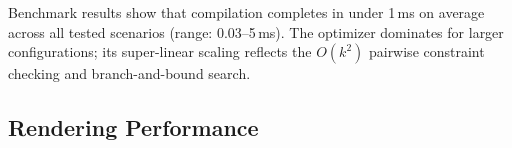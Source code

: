 \documentclass[sigchi, nonacm]{acmart}
\begin{document}


Benchmark results show that compilation completes in under 1\,ms on average across all tested scenarios (range: 0.03--5\,ms). The optimizer dominates for larger configurations; its super-linear scaling reflects the $O(k^2)$ pairwise constraint checking and branch-and-bound search.

\subsection{Rendering Performance}
\end{document}
